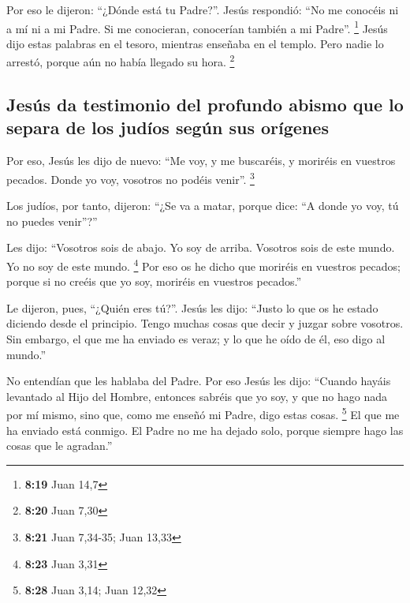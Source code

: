 \begin{paracol}{2}
 Por eso le dijeron: ``¿Dónde está tu Padre?''. Jesús
respondió: ``No me conocéis ni a mí ni a mi Padre. Si me conocieran,
conocerían también a mi Padre''. \footnote{\textbf{8:19} Juan 14,7}
 Jesús dijo estas palabras en el tesoro, mientras
enseñaba en el templo. Pero nadie lo arrestó, porque aún no había
llegado su hora. \footnote{\textbf{8:20} Juan 7,30}

\hypertarget{jesuxfas-da-testimonio-del-profundo-abismo-que-lo-separa-de-los-juduxedos-seguxfan-sus-oruxedgenes}{%
\subsection{Jesús da testimonio del profundo abismo que lo separa de los
judíos según sus
orígenes}\label{jesuxfas-da-testimonio-del-profundo-abismo-que-lo-separa-de-los-juduxedos-seguxfan-sus-oruxedgenes}}

 Por eso, Jesús les dijo de nuevo: ``Me voy, y me
buscaréis, y moriréis en vuestros pecados. Donde yo voy, vosotros no
podéis venir''. \footnote{\textbf{8:21} Juan 7,34-35; Juan 13,33}

 Los judíos, por tanto, dijeron: ``¿Se va a matar, porque
dice: ``A donde yo voy, tú no puedes venir''?''

 Les dijo: ``Vosotros sois de abajo. Yo soy de arriba.
Vosotros sois de este mundo. Yo no soy de este mundo. \footnote{\textbf{8:23}
  Juan 3,31}  Por eso os he dicho que moriréis en
vuestros pecados; porque si no creéis que yo soy, moriréis en vuestros
pecados.''

 Le dijeron, pues, ``¿Quién eres tú?''. Jesús les dijo:
``Justo lo que os he estado diciendo desde el principio. 
Tengo muchas cosas que decir y juzgar sobre vosotros. Sin embargo, el
que me ha enviado es veraz; y lo que he oído de él, eso digo al mundo.''

 No entendían que les hablaba del Padre. 
Por eso Jesús les dijo: ``Cuando hayáis levantado al Hijo del Hombre,
entonces sabréis que yo soy, y que no hago nada por mí mismo, sino que,
como me enseñó mi Padre, digo estas cosas. \footnote{\textbf{8:28} Juan
  3,14; Juan 12,32}  El que me ha enviado está conmigo.
El Padre no me ha dejado solo, porque siempre hago las cosas que le
agradan.''

\hypertarget{el-testimonio-de-jesuxfas-de-su-filiaciuxf3n-de-dios-y-de-la-esclavitud-del-pecado-de-los-juduxedos-a-pesar-de-su-descendencia-de-abraham}{%
}
\end{paracol}
